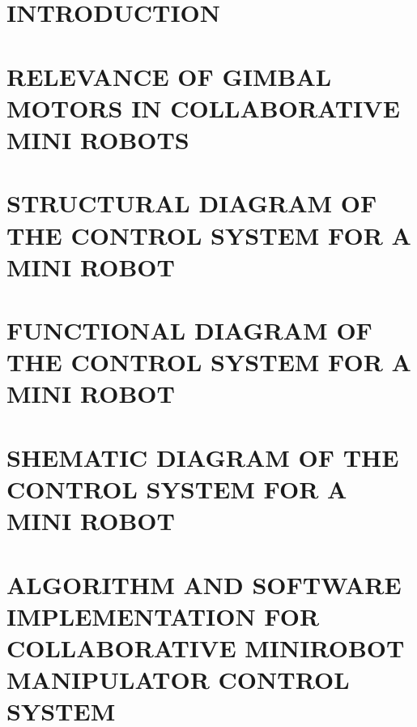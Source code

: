 \setlength{\headheight}{14.5pt}
\section*{INTRODUCTION}



\sloppypar
\raggedright 
\section{RELEVANCE OF GIMBAL MOTORS IN COLLABORATIVE MINI ROBOTS}
%
\sloppy
\section{STRUCTURAL DIAGRAM OF THE CONTROL SYSTEM FOR A MINI ROBOT}
%

\sloppy
\section{FUNCTIONAL DIAGRAM OF THE CONTROL SYSTEM FOR A MINI ROBOT}
%

\sloppy
\section{SHEMATIC DIAGRAM OF THE CONTROL SYSTEM FOR A MINI ROBOT}
%
\sloppy
\section{ALGORITHM AND SOFTWARE IMPLEMENTATION FOR COLLABORATIVE MINIROBOT MANIPULATOR CONTROL SYSTEM}
%
\raggedright

%




% 

